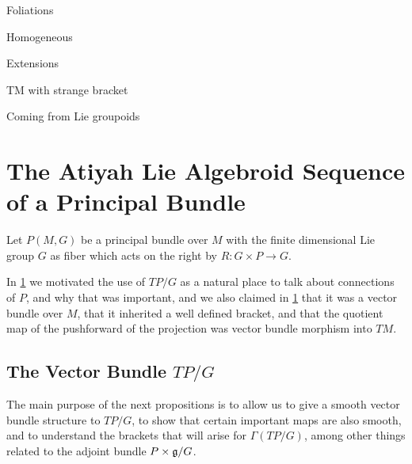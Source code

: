 Foliations

Homogeneous

Extensions

TM with strange bracket

Coming from Lie groupoids

\section{The Atiyah Lie Algebroid Sequence of a Principal Bundle}

Let $P(M, G)$ be a principal bundle over $M$ with the finite dimensional Lie group $G$ as fiber which acts on the right by $R: G \times P \to G$.

In \ref{} we motivated the use of $TP/G$ as a natural place to talk about connections of $P$, and why that was important, and we also claimed in \ref{} that it was a vector bundle over $M$, that it inherited a well defined bracket, and that the quotient map of the pushforward of the projection was vector bundle morphism into $TM$.

\subsection*{The Vector Bundle $TP/G$}

The main purpose of the next propositions is to allow us to give a smooth vector bundle structure to $TP/G$, to show that certain important maps are also smooth, and to understand the brackets that will arise for $\Gamma(TP/G)$, among other things related to the adjoint bundle $P\times \mathfrak{g}/G$.

